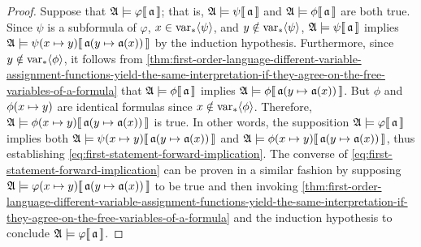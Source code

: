 \begin{proof}
    \vspace{0.1cm}
    \noindent
    Suppose that \(  \mathfrak{A} \models \varphi\llbracket\, \mathfrak{a} \,\rrbracket \); that is, \(  \mathfrak{A} \models \psi\llbracket\, \mathfrak{a} \,\rrbracket \)
    and \(  \mathfrak{A} \models \phi\llbracket\, \mathfrak{a} \,\rrbracket \) are both true.
    Since \( \psi \) is a subformula of \( \varphi \), \( x \in \operatorname{var}_{\ast} \langle\psi\rangle \), and \( y \notin \operatorname{var}_{\ast} \langle\psi\rangle \), \(  \mathfrak{A} \models \psi\llbracket\, \mathfrak{a} \,\rrbracket \) implies
    \( \folwffsatisfaction{\mathfrak{A}}{ \folfreevariablereplacement{\psi}{x}{y} }{ \folmodifiedvariableassignmentfunction{\mathfrak{a}}{y}{\mathfrak{a}(x)} } \)
    by the induction hypothesis.
    Furthermore, since \( y \notin \operatorname{var}_{\ast} \langle\phi\rangle \), it follows from
    \cref{thm:first-order-language-different-variable-assignment-functions-yield-the-same-interpretation-if-they-agree-on-the-free-variables-of-a-formula} that
    \(  \mathfrak{A} \models \phi\llbracket\, \mathfrak{a} \,\rrbracket \) implies
    \( \folwffsatisfaction{\mathfrak{A}}{\phi}{ \folmodifiedvariableassignmentfunction{\mathfrak{a}}{y}{\mathfrak{a}(x)} } \).
    But \( \phi \) and \( \folfreevariablereplacement{\phi}{x}{y} \) are identical formulas since \( x \notin \operatorname{var}_{\ast} \langle\phi\rangle \).
    Therefore, \( \folwffsatisfaction{\mathfrak{A}}{ \folfreevariablereplacement{\phi}{x}{y} }{ \folmodifiedvariableassignmentfunction{\mathfrak{a}}{y}{\mathfrak{a}(x)} }\)
    is true.
    In other words, the supposition \(  \mathfrak{A} \models \varphi\llbracket\, \mathfrak{a} \,\rrbracket \) implies both
    \( \folwffsatisfaction{\mathfrak{A}}{ \folfreevariablereplacement{\psi}{x}{y} }{ \folmodifiedvariableassignmentfunction{\mathfrak{a}}{y}{\mathfrak{a}(x)} } \)
    and
    \( \folwffsatisfaction{\mathfrak{A}}{ \folfreevariablereplacement{\phi}{x}{y} }{ \folmodifiedvariableassignmentfunction{\mathfrak{a}}{y}{\mathfrak{a}(x)} }\),
    thus establishing \eqref{eq:first-statement-forward-implication}.
    The converse of \eqref{eq:first-statement-forward-implication} can be proven in a similar fashion by
    supposing \( \folwffsatisfaction{\mathfrak{A}}{ \folfreevariablereplacement{\varphi}{x}{y} }{ \folmodifiedvariableassignmentfunction{\mathfrak{a}}{y}{\mathfrak{a}(x)} } \)
    to be true and then invoking
    \cref{thm:first-order-language-different-variable-assignment-functions-yield-the-same-interpretation-if-they-agree-on-the-free-variables-of-a-formula}
    and the induction hypothesis to conclude \(  \mathfrak{A} \models \varphi\llbracket\, \mathfrak{a} \,\rrbracket \).


\end{proof}
